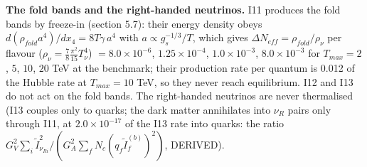 \documentclass[
  10pt,
]{article}
\begin{document}
\textbf{The fold bands and the right-handed neutrinos.} I11 produces the
fold bands by freeze-in (section 5.7): their energy density obeys
\(d(\rho_{fold}a^4)/dx_4 = 8T\gamma\,a^4\) with
\(a \propto g_s^{-1/3}/T\), which gives
\(\Delta N_{eff} = \rho_{fold}/\rho_{\nu}\) per flavour
(\(\rho_\nu = \frac78\frac{\pi^2}{15}T_\nu^4\)) \(= 8.0\times10^{-6}\),
\(1.25\times10^{-4}\), \(1.0\times10^{-3}\), \(8.0\times10^{-3}\) for
\(T_{max} = 2\), \(5\), \(10\), \(20\) TeV at the benchmark; their
production rate per quantum is 0.012 of the Hubble rate at
\(T_{max} = 10\) TeV, so they never reach equilibrium. I12 and I13 do
not act on the fold bands. The right-handed neutrinos are never
thermalised (I13 couples only to quarks; the dark matter annihilates
into \(\nu_R\) pairs only through I11, at \(2.0\times10^{-17}\) of the
I13 rate into quarks: the ratio
\(G_V^2\sum_i\tilde I_{\nu_{Ri}}^2/(G_A^2\sum_fN_c(q_f\tilde I^{(b)}_f)^2)\),
DERIVED).
\end{document}

